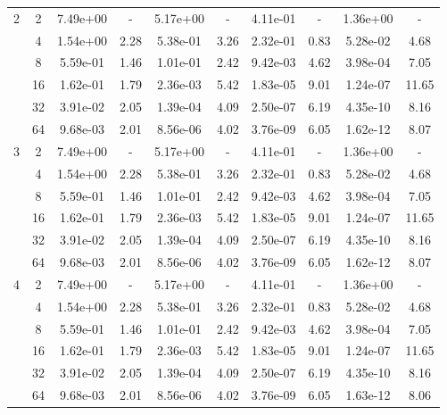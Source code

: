 \begin{table}[htbp]
\begin{center}
\begin{tabular}{| c | c | c c | c c | c c | c c |}
			2	& 2 & 7.49e+00 & - & 5.17e+00 & - & 4.11e-01 & - & 1.36e+00 & - \\
				& 4 & 1.54e+00 & 2.28 & 5.38e-01 & 3.26 & 2.32e-01 & 0.83 & 5.28e-02 & 4.68 \\
				& 8 & 5.59e-01 & 1.46 & 1.01e-01 & 2.42 & 9.42e-03 & 4.62 & 3.98e-04 & 7.05 \\
				& 16 & 1.62e-01 & 1.79 & 2.36e-03 & 5.42 & 1.83e-05 & 9.01 & 1.24e-07 & 11.65 \\
				& 32 & 3.91e-02 & 2.05 & 1.39e-04 & 4.09 & 2.50e-07 & 6.19 & 4.35e-10 & 8.16 \\
				& 64 & 9.68e-03 & 2.01 & 8.56e-06 & 4.02 & 3.76e-09 & 6.05 & 1.62e-12 & 8.07 \\

			\hline

			3	& 2 & 7.49e+00 & - & 5.17e+00 & - & 4.11e-01 & - & 1.36e+00 & - \\
				& 4 & 1.54e+00 & 2.28 & 5.38e-01 & 3.26 & 2.32e-01 & 0.83 & 5.28e-02 & 4.68 \\
				& 8 & 5.59e-01 & 1.46 & 1.01e-01 & 2.42 & 9.42e-03 & 4.62 & 3.98e-04 & 7.05 \\
				& 16 & 1.62e-01 & 1.79 & 2.36e-03 & 5.42 & 1.83e-05 & 9.01 & 1.24e-07 & 11.65 \\
				& 32 & 3.91e-02 & 2.05 & 1.39e-04 & 4.09 & 2.50e-07 & 6.19 & 4.35e-10 & 8.16 \\
				& 64 & 9.68e-03 & 2.01 & 8.56e-06 & 4.02 & 3.76e-09 & 6.05 & 1.62e-12 & 8.07 \\

			\hline

			4	& 2 & 7.49e+00 & - & 5.17e+00 & - & 4.11e-01 & - & 1.36e+00 & - \\
				& 4 & 1.54e+00 & 2.28 & 5.38e-01 & 3.26 & 2.32e-01 & 0.83 & 5.28e-02 & 4.68 \\
				& 8 & 5.59e-01 & 1.46 & 1.01e-01 & 2.42 & 9.42e-03 & 4.62 & 3.98e-04 & 7.05 \\
				& 16 & 1.62e-01 & 1.79 & 2.36e-03 & 5.42 & 1.83e-05 & 9.01 & 1.24e-07 & 11.65 \\
				& 32 & 3.91e-02 & 2.05 & 1.39e-04 & 4.09 & 2.50e-07 & 6.19 & 4.35e-10 & 8.16 \\
				& 64 & 9.68e-03 & 2.01 & 8.56e-06 & 4.02 & 3.76e-09 & 6.05 & 1.63e-12 & 8.06 \\	

			\hline
		\end{tabular}
	\end{center}
\end{table}

